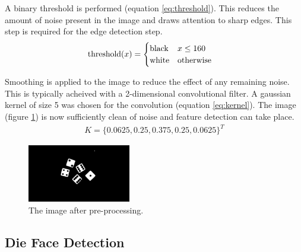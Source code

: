 \documentclass[conference]{IEEEtran}
\begin{document}
A binary threshold is performed (equation \ref{eq:threshold}).
This reduces the amount of noise present in the image and draws attention to sharp edges.
This step is required for the edge detection step.
\begin{align}
	\textnormal{threshold}(x) &= \begin{cases}
		\textnormal{black} & x \leq 160 \\
		\textnormal{white} & \textnormal{otherwise}
	\end{cases} \label{eq:threshold}
\end{align}

Smoothing is applied to the image to reduce the effect of any remaining noise.
This is typically acheived with a 2-dimensional convolutional filter.
A gaussian kernel of size 5 was chosen for the convolution (equation \ref{eq:kernel}). 
The image (figure \ref{fig:blurred}) is now sufficiently clean of noise and feature detection can take place.
\begin{align}
	K = \{0.0625, 0.25, 0.375, 0.25, 0.0625\}^T \label{eq:kernel}
\end{align}
\begin{figure}
	\centering
	\includegraphics[width=0.4\textwidth]{blur}
	\caption{The image after pre-processing.}
	\label{fig:blurred}
\end{figure}

\subsection{Die Face Detection}
\end{document}
